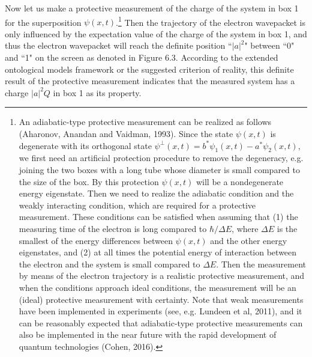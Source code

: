 Now let us make a protective measurement of the charge of the system in box 1 for the superposition $\psi(x,t)$.\footnote{An adiabatic-type protective measurement can be realized as follows (Aharonov, Anandan and Vaidman, 1993). Since the state $\psi(x,t)$ is degenerate with its orthogonal state $\psi^{\perp}(x,t)=b^*\psi_1(x,t)-a^*\psi_2(x,t)$, we first need an artificial protection procedure to remove the degeneracy, e.g. joining the two boxes with a long tube whose diameter is small compared to the size of the box. By this protection $\psi(x,t)$ will be a nondegenerate energy eigenstate. Then we need to realize the adiabatic condition and the weakly interacting condition, which are required for a protective measurement. These conditions can be satisfied when assuming that (1) the measuring time of the electron is long compared to $\hbar/\Delta E$, where $\Delta E$ is the smallest of the energy differences between $\psi(x,t)$ and the other energy eigenstates, and (2) at all times the potential energy of interaction between the electron and the system is small compared to $\Delta E$. Then the measurement by means of the electron trajectory is a realistic protective measurement, and when the conditions approach ideal conditions, the measurement will be an (ideal) protective measurement with certainty. Note that weak measurements have been implemented in experiments (see, e.g. Lundeen et al, 2011), and it can be reasonably expected that adiabatic-type protective measurements can also be implemented in the near future with the rapid development of quantum technologies (Cohen, 2016).} 
Then the trajectory of the electron wavepacket is only influenced by the expectation value of the charge of the system in box 1, and thus the electron wavepacket will reach the definite position ``$|a|^2$" between ``0" and ``1"  on the screen as denoted in Figure 6.3. %
According to the extended ontological models framework or the suggested criterion of reality, this definite result of the protective measurement indicates that the measured system has a charge $|a|^2Q$ in box 1 as its property. 

